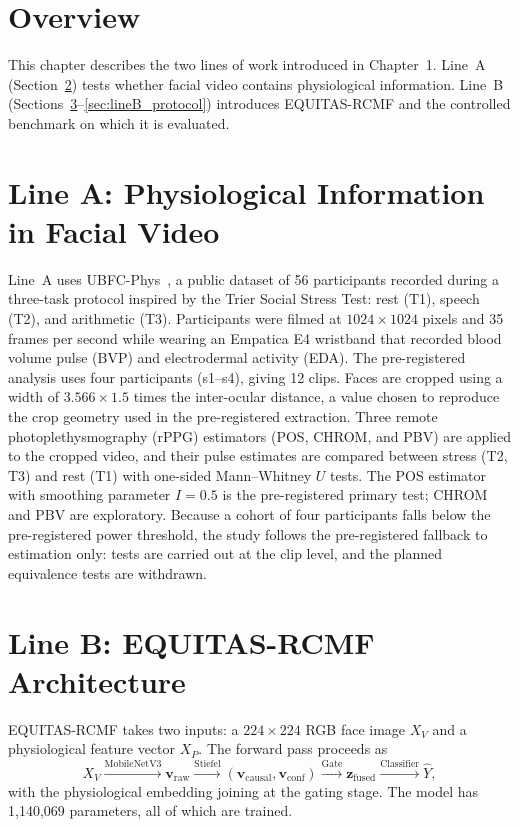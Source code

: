 \section{Overview}
This chapter describes the two lines of work introduced in Chapter~1. Line~A (Section~\ref{sec:lineA}) tests whether facial video contains physiological information. Line~B (Sections~\ref{sec:arch_overview}--\ref{sec:lineB_protocol}) introduces EQUITAS-RCMF and the controlled benchmark on which it is evaluated.

\section{Line A: Physiological Information in Facial Video}
\label{sec:lineA}
Line~A uses UBFC-Phys~\cite{sabour2023}, a public dataset of 56 participants recorded during a three-task protocol inspired by the Trier Social Stress Test: rest (T1), speech (T2), and arithmetic (T3). Participants were filmed at $1024 \times 1024$ pixels and 35 frames per second while wearing an Empatica E4 wristband that recorded blood volume pulse (BVP) and electrodermal activity (EDA). The pre-registered analysis uses four participants (s1--s4), giving 12 clips. Faces are cropped using a width of $3.566 \times 1.5$ times the inter-ocular distance, a value chosen to reproduce the crop geometry used in the pre-registered extraction. Three remote photoplethysmography (rPPG) estimators (POS, CHROM, and PBV) are applied to the cropped video, and their pulse estimates are compared between stress (T2, T3) and rest (T1) with one-sided Mann--Whitney $U$ tests. The POS estimator with smoothing parameter $I = 0.5$ is the pre-registered primary test; CHROM and PBV are exploratory. Because a cohort of four participants falls below the pre-registered power threshold, the study follows the pre-registered fallback to estimation only: tests are carried out at the clip level, and the planned equivalence tests are withdrawn.

\section{Line B: EQUITAS-RCMF Architecture}
\label{sec:arch_overview}
EQUITAS-RCMF takes two inputs: a $224 \times 224$ RGB face image $X_V$ and a physiological feature vector $X_P$. The forward pass proceeds as
\begin{equation}
X_V \xrightarrow{\text{MobileNetV3}} \mathbf{v}_{\text{raw}}
\xrightarrow{\text{Stiefel}} (\mathbf{v}_{\text{causal}}, \mathbf{v}_{\text{conf}})
\xrightarrow{\text{Gate}} \mathbf{z}_{\text{fused}}
\xrightarrow{\text{Classifier}} \hat{Y},
\end{equation}
with the physiological embedding joining at the gating stage. The model has 1,140,069 parameters, all of which are trained.

